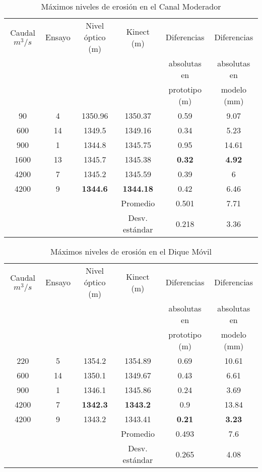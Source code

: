 \begin {table}[H]
\caption {Máximos niveles de erosión en el Canal Moderador} 
\label{tab:erosion-maxima-cm} 
\begin{center}

\begin{tabular}{|c|c|c|c|c|c|}
\hline 
Caudal $m^{3}/s$&Ensayo&Nivel óptico (m)&Kinect (m)&Diferencias &Diferencias\\
                &      &                &          &absolutas en &absolutas en\\
                &      &                &          &prototipo (m)&modelo (mm)\\ 
\hline 
90 & 4 & 1350.96 & 1350.37 & 0.59 & 9.07\\ 
\hline 
600 & 14 & 1349.5 & 1349.16 & 0.34 & 5.23 \\ 
\hline 
900 & 1 & 1344.8 & 1345.75 & 0.95 & 14.61\\ 
\hline 
1600 & 13 & 1345.7 & 1345.38 & \textbf{0.32} & \textbf{4.92}\\
\hline
4200 & 7 & 1345.2 & 1345.59 & 0.39 & 6\\ 
\hline 
4200 & 9 & \textbf{1344.6} & \textbf{1344.18} & 0.42 & 6.46 \\ 
\hline 
     &   &        & Promedio & 0.501 & 7.71 \\    
\hline 
     &   &        & Desv. estándar & 0.218 & 3.36 \\
\hline 
\end{tabular}
\end{center}
\end{table}

\begin {table}[H]
\caption {Máximos niveles de erosión en el Dique Móvil} 
\label{tab:erosion-maxima-dm}
\begin{center}
 
\begin{tabular}{|c|c|c|c|c|c|}
\hline 
Caudal $m^{3}/s$&Ensayo&Nivel óptico (m)&Kinect (m)&Diferencias &Diferencias\\
                &      &                &          &absolutas en &absolutas en\\
                &      &                &          &prototipo (m)&modelo (mm)\\ 
\hline 
220 & 5 & 1354.2 & 1354.89 & 0.69 & 10.61 \\ 
\hline 
600 & 14 & 1350.1 & 1349.67 & 0.43 & 6.61 \\   
\hline 
900 & 1 & 1346.1 & 1345.86 & 0.24 & 3.69 \\ 
\hline 
4200 & 7 & \textbf{1342.3} & \textbf{1343.2} & 0.9 & 13.84 \\  
\hline 
4200 & 9 & 1343.2 & 1343.41 & \textbf{0.21} & \textbf{3.23} \\
\hline 
     &   &        & Promedio & 0.493 & 7.6 \\
\hline 
     &   &        & Desv. estándar & 0.265 & 4.08 \\
\hline 
\end{tabular}
\end{center}
\end{table}

